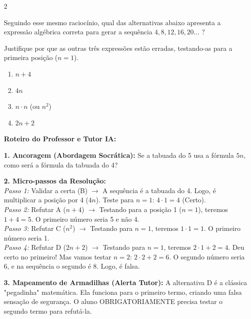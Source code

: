 \begin{multicols*}{2}
\begin{enunciadoLiteral}
Seguindo esse mesmo raciocínio, qual das alternativas abaixo apresenta a expressão algébrica correta para gerar a sequência $ 4, 8, 12, 16, 20 \dots $ ? 

Justifique por que as outras três expressões estão erradas, testando-as para a primeira posição ($n=1$).

\begin{enumerate}[label=\alph*), itemsep=\espacoAlt]
    \item $ n + 4 $
    \item $ 4n $
    \item $ n \cdot n $ (ou $n^2$)
    \item $ 2n + 2 $
\end{enumerate}
\end{enunciadoLiteral}

\ifgabarito
    \begin{tcolorbox}[colback=CorTitUm!5, colframe=CorTitUm, boxrule=1pt, arc=4pt, left=6pt, right=6pt, top=6pt, bottom=6pt]
    \small\textbf{\textcolor{CorTitUm}{Roteiro do Professor e Tutor IA:}}\par\vspace{0.1cm}
    \color{CinzaEscuro}
    \textbf{1. Ancoragem (Abordagem Socrática):} Se a tabuada do 5 usa a fórmula $5n$, como será a fórmula da tabuada do 4?\par\vspace{0.1cm}
    
    \textbf{2. Micro-passos da Resolução:}\\
    \textit{Passo 1:} Validar a certa (B) $\rightarrow$ A sequência é a tabuada do 4. Logo, é multiplicar a posição por 4 ($4n$). Teste para $n=1$: $4 \cdot 1 = 4$ (Certo).\\
    \textit{Passo 2:} Refutar A ($n+4$) $\rightarrow$ Testando para a posição 1 ($n=1$), teremos $1+4=5$. O primeiro número seria 5 e não 4.\\
    \textit{Passo 3:} Refutar C ($n^2$) $\rightarrow$ Testando para $n=1$, teremos $1 \cdot 1 = 1$. O primeiro número seria 1.\\
    \textit{Passo 4:} Refutar D ($2n+2$) $\rightarrow$ Testando para $n=1$, teremos $2 \cdot 1 + 2 = 4$. Deu certo no primeiro! Mas vamos testar $n=2$: $2 \cdot 2 + 2 = 6$. O segundo número seria 6, e na sequência o segundo é 8. Logo, é falsa.\par\vspace{0.1cm}
    
    \textbf{3. Mapeamento de Armadilhas (Alerta Tutor):} A alternativa D é a clássica "pegadinha" matemática. Ela funciona para o primeiro termo, criando uma falsa sensação de segurança. O aluno OBRIGATORIAMENTE precisa testar o segundo termo para refutá-la.
    \end{tcolorbox}
    \vspace{0.15cm}
    

\end{multicols*}
